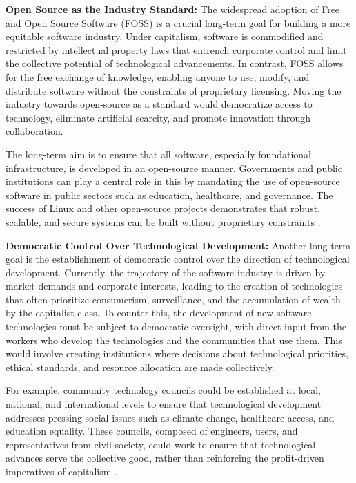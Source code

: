 \begin{refsection}
\textbf{Open Source as the Industry Standard:}
The widespread adoption of Free and Open Source Software (FOSS) is a crucial long-term goal for building a more equitable software industry. Under capitalism, software is commodified and restricted by intellectual property laws that entrench corporate control and limit the collective potential of technological advancements. In contrast, FOSS allows for the free exchange of knowledge, enabling anyone to use, modify, and distribute software without the constraints of proprietary licensing. Moving the industry towards open-source as a standard would democratize access to technology, eliminate artificial scarcity, and promote innovation through collaboration.

The long-term aim is to ensure that all software, especially foundational infrastructure, is developed in an open-source manner. Governments and public institutions can play a central role in this by mandating the use of open-source software in public sectors such as education, healthcare, and governance. The success of Linux and other open-source projects demonstrates that robust, scalable, and secure systems can be built without proprietary constraints \cite[pp.~57-60]{stallman2010}.

\textbf{Democratic Control Over Technological Development:}
Another long-term goal is the establishment of democratic control over the direction of technological development. Currently, the trajectory of the software industry is driven by market demands and corporate interests, leading to the creation of technologies that often prioritize consumerism, surveillance, and the accumulation of wealth by the capitalist class. To counter this, the development of new software technologies must be subject to democratic oversight, with direct input from the workers who develop the technologies and the communities that use them. This would involve creating institutions where decisions about technological priorities, ethical standards, and resource allocation are made collectively.

For example, community technology councils could be established at local, national, and international levels to ensure that technological development addresses pressing social issues such as climate change, healthcare access, and education equality. These councils, composed of engineers, users, and representatives from civil society, could work to ensure that technological advances serve the collective good, rather than reinforcing the profit-driven imperatives of capitalism \cite[pp.~88-90]{zuboff2020}.


\end{refsection}
